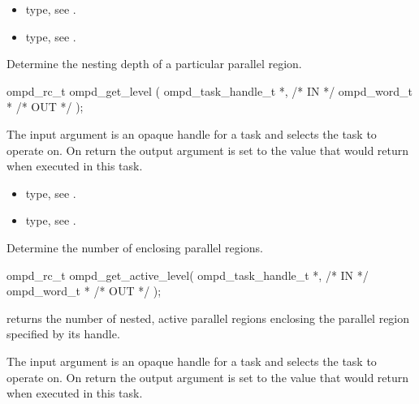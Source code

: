 \crossreferences
\begin{itemize}
	\item {} type, see .
	\item {} type, see .
\end{itemize}


\summary
Determine the nesting depth of a particular parallel region.

\format
\cspecificstart
\begin{boxedcode}
ompd\_rc\_t ompd\_get\_level (
  ompd\_task\_handle\_t *,                                 /* IN */
  ompd\_word\_t *                                         /* OUT */
); 
\end{boxedcode}
\cspecificend

\descr

\argdesc
The input argument  is an opaque handle for a task and selects the task to operate on.
On return the output argument  is set to the value that  would return when
executed in this task.


\crossreferences
\begin{itemize}
	\item {} type, see .
	\item {} type, see .
\end{itemize}


\summary
Determine the number of enclosing  parallel regions.

\format
\cspecificstart
\begin{boxedcode}
ompd\_rc\_t ompd\_get\_active\_level(
  ompd\_task\_handle\_t *,                                 /* IN */
  ompd\_word\_t *                                         /* OUT */
); 
\end{boxedcode}
\cspecificend

\descr
{} returns the number of nested, active
parallel regions enclosing the parallel region specified by its handle.

\argdesc
The input argument  is an opaque handle for a task and selects the task to operate on.
On return the output argument  is set to the value that  would return when
executed in this task.

